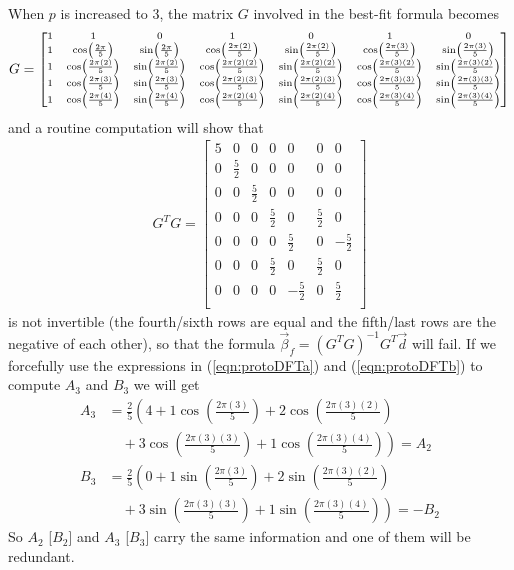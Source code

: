 \begin{solution}
\begin{align*}
\end{align*}
When $p$ is increased to $3$, the matrix $G$ involved in the best-fit formula becomes
\begin{align*}
\scriptsize
G = 
\begin{bmatrix}
1 & 1 & 0 & 1 & 0 & 1 & 0 \\
1 & \cos(\frac{2\pi}{5}) & \sin(\frac{2\pi}{5}) & \cos(\frac{2\pi(2)}{5}) & \sin(\frac{2\pi(2)}{5}) & \cos(\frac{2\pi(3)}{5}) & \sin(\frac{2\pi(3)}{5})\\
1 & \cos(\frac{2\pi(2)}{5}) & \sin(\frac{2\pi(2)}{5}) & \cos(\frac{2\pi(2)(2)}{5}) & \sin(\frac{2\pi(2)(2)}{5}) & \cos(\frac{2\pi(3)(2)}{5}) & \sin(\frac{2\pi(3)(2)}{5}) \\
1 & \cos(\frac{2\pi(3)}{5}) & \sin(\frac{2\pi(3)}{5}) & \cos(\frac{2\pi(2)(3)}{5}) & \sin(\frac{2\pi(2)(3)}{5}) & \cos(\frac{2\pi(3)(3)}{5}) & \sin(\frac{2\pi(3)(3)}{5})\\
1 & \cos(\frac{2\pi(4)}{5}) & \sin(\frac{2\pi(4)}{5}) & \cos(\frac{2\pi(2)(4)}{5}) & \sin(\frac{2\pi(2)(4)}{5}) & \cos(\frac{2\pi(3)(4)}{5}) & \sin(\frac{2\pi(3)(4)}{5})
\end{bmatrix}    
\end{align*}
and a routine computation will show that
\begin{align*}
G^T G = 
\begin{bmatrix}
5 & 0 & 0 & 0 & 0 & 0 & 0 \\
0 & \frac{5}{2} & 0 & 0 & 0 & 0 & 0 \\
0 & 0 & \frac{5}{2} & 0 & 0 & 0 & 0 \\
0 & 0 & 0 & \frac{5}{2} & 0 & \frac{5}{2} & 0 \\
0 & 0 & 0 & 0 & \frac{5}{2} & 0 & -\frac{5}{2} \\
0 & 0 & 0 & \frac{5}{2} & 0 & \frac{5}{2} & 0 \\
0 & 0 & 0 & 0 & -\frac{5}{2} & 0 & \frac{5}{2} \\
\end{bmatrix}
\end{align*}
is not invertible (the fourth/sixth rows are equal and the fifth/last rows are the negative of each other), so that the formula $\vec{\beta}_f = (G^TG)^{-1}G^T\vec{d}$ will fail. If we forcefully use the expressions in (\ref{eqn:protoDFTa}) and (\ref{eqn:protoDFTb}) to compute $A_3$ and $B_3$ we will get
\begin{align*}
A_3 &= \frac{2}{5} \left(4 + 1\cos(\frac{2\pi(3)}{5}) + 2\cos(\frac{2\pi(3)(2)}{5}) \right. \\
&\quad \left.{} + 3\cos(\frac{2\pi(3)(3)}{5}) + 1\cos(\frac{2\pi(3)(4)}{5})\right) = A_2 \\
B_3 &= \frac{2}{5} \left(0 + 1\sin(\frac{2\pi(3)}{5}) + 2\sin(\frac{2\pi(3)(2)}{5}) \right. \\
&\quad \left.{} + 3\sin(\frac{2\pi(3)(3)}{5}) + 1\sin(\frac{2\pi(3)(4)}{5})\right) = -B_2    
\end{align*}
So $A_2$ [$B_2$] and $A_3$ [$B_3$] carry the same information and one of them will be redundant.
\end{solution}


